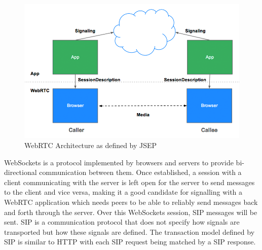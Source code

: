 \documentclass[]{report}
\begin{document}
			\begin{figure}[h!]
				\caption{WebRTC Architecture as defined by JSEP \cite{JSEP}}
				\includegraphics[scale=0.4]{jsep.png}
			\end{figure}
			\newpage
			
			WebSockets is a protocol implemented by browsers and servers to provide bi-directional communication between them\cite{WebSockets}. Once established, a session with a client communicating with the server is left open for the server to send messages to the client and vice versa, making it a good candidate for signalling with a WebRTC application which needs peers to be able to reliably send messages back and forth through the server. Over this WebSockets session, SIP messages will be sent. SIP is a communication protocol that does not specify how signals are transported but how these signals are defined. The transaction model defined by SIP is similar to HTTP with each SIP request being matched by a SIP response.
			
\end{document}
